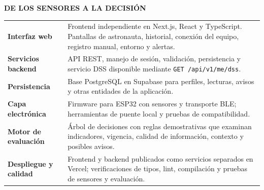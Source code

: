 \documentclass[10pt,a4paper]{article}
\newcommand{\heading}[2]{\par\vspace{8pt}{\large\bfseries\color{navy}#1}\hfill{\footnotesize\bfseries\color{blue}#2}\par\vspace{-1pt}{\color{blue}\rule{\linewidth}{1pt}}\vspace{3pt}}
\begin{document}
\newpage
\heading{06  Arquitectura tecnológica}{DE LOS SENSORES A LA DECISIÓN}
\begin{center}
\end{center}
\par\noindent\begin{tabularx}{\linewidth}{@{}>{\raggedright\arraybackslash\bfseries\color{navy}}p{40mm}X@{}}
Interfaz web & Frontend independiente en Next.js, React y TypeScript. Pantallas de astronauta, historial, conexión del equipo, registro manual, entorno y alertas.\\[5pt]
Servicios backend & API REST, manejo de sesión, validación, persistencia y servicio DSS disponible mediante \texttt{GET /api/v1/me/dss}.\\[5pt]
Persistencia & Base PostgreSQL en Supabase para perfiles, lecturas, avisos y otras entidades de la aplicación.\\[5pt]
Capa electrónica & Firmware para ESP32 con sensores y transporte BLE; herramientas de puente local y pruebas de compatibilidad.\\[5pt]
Motor de evaluación & Árbol de decisiones con reglas demostrativas que examinan indicadores, vigencia, calidad de información, contexto y posibles avisos.\\[5pt]
Despliegue y calidad & Frontend y backend publicados como servicios separados en Vercel; verificaciones de tipos, lint, compilación y pruebas de sensores y evaluación.\\
\end{tabularx}\par
\end{document}
